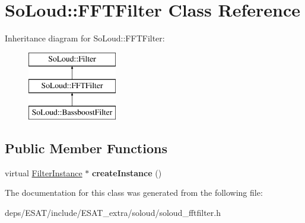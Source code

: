 \hypertarget{class_so_loud_1_1_f_f_t_filter}{}\section{So\+Loud\+:\+:F\+F\+T\+Filter Class Reference}
\label{class_so_loud_1_1_f_f_t_filter}
Inheritance diagram for So\+Loud\+:\+:F\+F\+T\+Filter\+:\begin{figure}[H]
\begin{center}
\leavevmode
\includegraphics[height=3.000000cm]{class_so_loud_1_1_f_f_t_filter}
\end{center}
\end{figure}
\subsection*{Public Member Functions}
\begin{DoxyCompactItemize}
\item 
\mbox{\label{class_so_loud_1_1_f_f_t_filter_a4a0ca82f6ad367aab4eb8baa09e6bb2e}} 
virtual \mbox{\hyperlink{class_so_loud_1_1_filter_instance}{Filter\+Instance}} $\ast$ {\bfseries create\+Instance} ()
\end{DoxyCompactItemize}


The documentation for this class was generated from the following file\+:\begin{DoxyCompactItemize}
\item 
deps/\+E\+S\+A\+T/include/\+E\+S\+A\+T\+\_\+extra/soloud/soloud\+\_\+fftfilter.\+h\end{DoxyCompactItemize}
